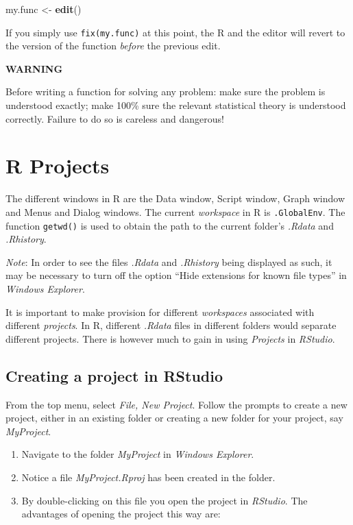 \documentclass[
]{book}
\newenvironment{Shaded}{\begin{snugshade}}{\end{snugshade}}
\newcommand{\FunctionTok}[1]{\textcolor[rgb]{0.13,0.29,0.53}{\textbf{#1}}}
\newcommand{\NormalTok}[1]{#1}
\newcommand{\OtherTok}[1]{\textcolor[rgb]{0.56,0.35,0.01}{#1}}
\begin{document}
\begin{Shaded}
\begin{Highlighting}[]
\NormalTok{my.func }\OtherTok{\textless{}{-}} \FunctionTok{edit}\NormalTok{()}
\end{Highlighting}
\end{Shaded}

If you simply use \texttt{fix(my.func)} at this point, the R and the editor will revert to the version of the function \emph{before} the previous edit.

\textbf{WARNING}

Before writing a function for solving any problem: make sure the problem is understood exactly; make 100\% sure the relevant statistical theory is understood correctly. Failure to do so is careless and dangerous!

\section{R Projects}\label{r-projects}

The different windows in R are the Data window, Script window, Graph window and Menus and Dialog windows. The current \emph{{workspace}} in R is \texttt{.GlobalEnv}. The function \texttt{getwd()} is used to obtain the path to the current folder's \emph{{.Rdata}} and \emph{{.Rhistory}}.

\emph{Note}: In order to see the files \emph{{.Rdata}} and \emph{{.Rhistory}} being displayed as such, it may be necessary to turn off the option ``Hide extensions for known file types'' in \emph{{Windows Explorer}}.

It is important to make provision for different \emph{{workspaces}} associated with different \emph{{projects}}. In R, different \emph{{.Rdata}} files in different folders would separate different projects. There is however much to gain in using \emph{Projects} in \emph{{RStudio}}.

\subsection{Creating a project in RStudio}\label{creating-a-project-in-rstudio}

From the top menu, select \emph{File, New Project}. Follow the prompts to create a new project, either in an existing folder or creating a new folder for your project, say \emph{{MyProject}}.

\begin{enumerate}
\def\labelenumi{(\alph{enumi})}
\item
  Navigate to the folder \emph{{MyProject}} in \emph{{Windows Explorer}}.
\item
  Notice a file \emph{{MyProject.Rproj}} has been created in the folder.
\item
  By double-clicking on this file you open the project in \emph{{RStudio}}. The advantages of opening the project this way are:
\end{enumerate}
\end{document}

